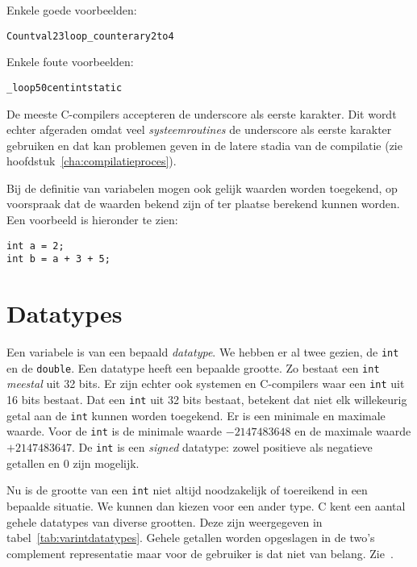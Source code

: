 Enkele goede voorbeelden:

\hspace*{1em}\texttt{Count}\quad\texttt{val23}\quad\texttt{loop\_counter}\quad\texttt{ary2to4}

Enkele foute voorbeelden:

\hspace*{1em}\texttt{\_loop}\quad\texttt{50cent}\quad\texttt{int}\quad\texttt{static}

De meeste C-compilers accepteren de underscore als eerste karakter. Dit wordt echter afgeraden omdat veel \textsl{systeemroutines} de underscore als eerste karakter gebruiken en dat kan problemen geven in de latere stadia van de compilatie (zie hoofdstuk~\ref{cha:compilatieproces}).

Bij de definitie van variabelen mogen ook gelijk waarden worden toegekend, op voorspraak dat de waarden bekend zijn of ter plaatse berekend kunnen worden. Een voorbeeld is hieronder te zien:

\hspace*{1em}\texttt{int a = 2;}\\
\hspace*{1em}\texttt{int b = a + 3 + 5;}


\section{Datatypes}
Een variabele is van een bepaald \textsl{datatype}. We hebben er al twee gezien, de \texttt{int} en de \texttt{double}. Een datatype heeft een bepaalde grootte. Zo bestaat een \texttt{int} \textsl{meestal} uit 32 bits. Er zijn echter ook systemen en C-compilers waar een \texttt{int} uit 16 bits bestaat. Dat een \texttt{int} uit 32 bits bestaat, betekent dat niet elk willekeurig getal aan de \texttt{int} kunnen worden toegekend. Er is een minimale en maximale waarde. Voor de \texttt{int} is de minimale waarde $-2147483648$ en de maximale waarde $+2147483647$. De \texttt{int} is een \textsl{signed} datatype: zowel positieve als negatieve getallen en 0 zijn mogelijk.

Nu is de grootte van een \texttt{int} niet altijd noodzakelijk of toereikend in een bepaalde situatie. We kunnen dan kiezen voor een ander type. C kent een aantal gehele datatypes van diverse grootten. Deze zijn weergegeven in tabel~\ref{tab:varintdatatypes}. Gehele getallen worden opgeslagen in de two's complement representatie maar voor de gebruiker is dat niet van belang. Zie~\cite{opdenbrouw2020}.

